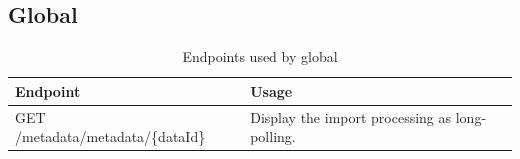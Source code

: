 \subsection{Global}
\begin{table}[H]
	\caption{Endpoints used by global}
	\begin{tabularx}{\textwidth}{|l|X|}
		\hline
		\textbf{Endpoint} & \textbf{Usage} \\ \hline
		GET /metadata/metadata/\{dataId\} & Display the import processing as long-polling. \\ \hline
	\end{tabularx}
\end{table}
